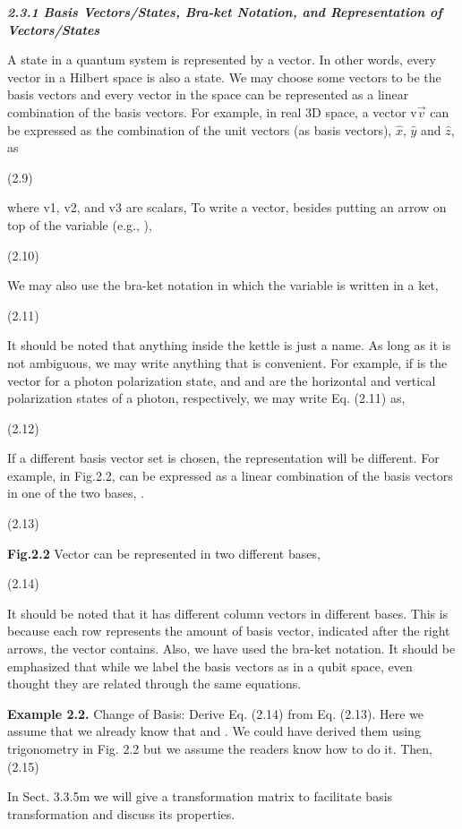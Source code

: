 \documentclass{article}
\newcommand{\bfit}[1]{\textit{\textbf{#1}}}
\begin{document}
\bfit{2.3.1 Basis Vectors/States, Bra-ket Notation, and Representation of Vectors/States}

A state in a quantum system is represented by a vector. In other words, every vector in a Hilbert space is also a state. We may choose some vectors to be the basis vectors and every vector in the space can be represented as a linear combination of the basis vectors. For example, 
in real 3D space, a vector v$\vec{v}$ can be expressed as the combination of the unit vectors (as basis vectors),  $\hat{x}$, $\hat{y}$ and $\hat{z}$, as

			(2.9)

where v1, v2, and v3 are scalars,
To write a vector, besides putting an arrow on top of the variable (e.g., ),

 		(2.10)

We may also use the bra-ket notation in which the variable is written in a ket,

		(2.11)

It should be noted that anything inside the kettle is just a name. As long as it is not ambiguous, we may write anything that is convenient. For example, if  is the vector for a photon polarization state, and  and  are the horizontal and vertical polarization states of a photon, respectively, we may write Eq. (2.11) as, 


(2.12)

If a different basis vector set is chosen, the representation will be different. For example, in Fig.2.2,  can be expressed as a linear combination of the basis vectors in one of the two bases, .

		(2.13)


\textbf{Fig.2.2} Vector  can be represented in two different bases, 






















		(2.14)


It should be noted that it has different column vectors in different bases. This is because each row represents the amount of basis vector, indicated after the right arrows, the vector contains. Also, we have used the bra-ket notation. It should be emphasized that while we label the basis vectors as  in a qubit space, even thought they are related through the same equations.

\textbf{Example 2.2.} Change of Basis: Derive Eq. (2.14) from Eq. (2.13).
Here we assume that we already know that  and . We could have derived them using trigonometry in Fig. 2.2 but we assume the readers know how to do it. Then,
		(2.15)

In Sect. 3.3.5m we will give a transformation matrix to facilitate basis transformation and discuss its properties.
\end{document}
